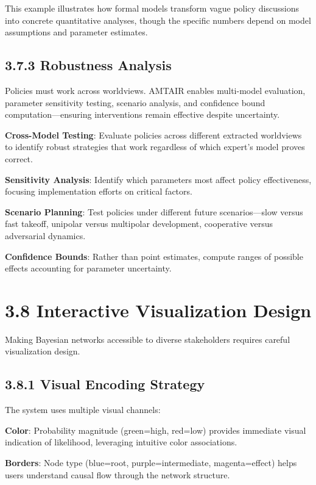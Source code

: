 \documentclass[
  11pt,
  letterpaper,
]{book}
\begin{document}
This example illustrates how formal models transform vague policy
discussions into concrete quantitative analyses, though the specific
numbers depend on model assumptions and parameter estimates.

\subsection{3.7.3 Robustness Analysis}\label{sec-robustness}

Policies must work across worldviews. AMTAIR enables multi-model
evaluation, parameter sensitivity testing, scenario analysis, and
confidence bound computation---ensuring interventions remain effective
despite uncertainty.

\textbf{Cross-Model Testing}: Evaluate policies across different
extracted worldviews to identify robust strategies that work regardless
of which expert's model proves correct.

\textbf{Sensitivity Analysis}: Identify which parameters most affect
policy effectiveness, focusing implementation efforts on critical
factors.

\textbf{Scenario Planning}: Test policies under different future
scenarios---slow versus fast takeoff, unipolar versus multipolar
development, cooperative versus adversarial dynamics.

\textbf{Confidence Bounds}: Rather than point estimates, compute ranges
of possible effects accounting for parameter uncertainty.

\section{3.8 Interactive Visualization
Design}\label{sec-visualization-design}

Making Bayesian networks accessible to diverse stakeholders requires
careful visualization design.

\subsection{3.8.1 Visual Encoding Strategy}\label{sec-visual-encoding}

The system uses multiple visual channels:

\textbf{Color}: Probability magnitude (green=high, red=low) provides
immediate visual indication of likelihood, leveraging intuitive color
associations.

\textbf{Borders}: Node type (blue=root, purple=intermediate,
magenta=effect) helps users understand causal flow through the network
structure.
\end{document}
